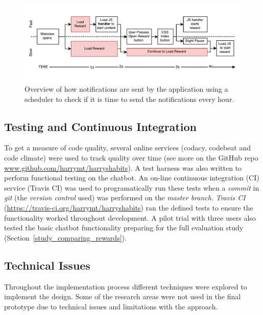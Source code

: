 \begin{figure}[H]
    \centering
    \includegraphics[width=6in]{../resources/diagrams/webview-flow-diagram.pdf}
    \caption{Overview of how notifications are sent by the application using a scheduler to check if it is time to send the notifications every hour.}
    \label{fig:fast_slow_opening_rewards}
\end{figure}


\subsection{Testing and Continuous Integration}
To get a measure of code quality, several online services (codacy, codebeat and code climate) were used to track quality over time (see more on the GitHub repo \url{www.github.com/harrymt/harryshabits}). A test harness was also written to perform functional testing on the chatbot. An on-line continuous integration (CI) service (Travis CI) was used to programatically run these tests when a \textit{commit} in \textit{git} (the \textit{version control} used) was performed on the \textit{master branch}. \textit{Travis CI} (\url{https://travis-ci.org/harrymt/harryshabits}) ran the defined tests to ensure the functionality worked throughout development. A pilot trial with three users also tested the basic chatbot functionality preparing for the full evaluation study (Section~\ref{study_comparing_rewards}).

\subsection{Technical Issues}
Throughout the implementation process different techniques were explored to implement the design.
Some of the research areas were not used in the final prototype due to technical issues and limitations with the approach.

